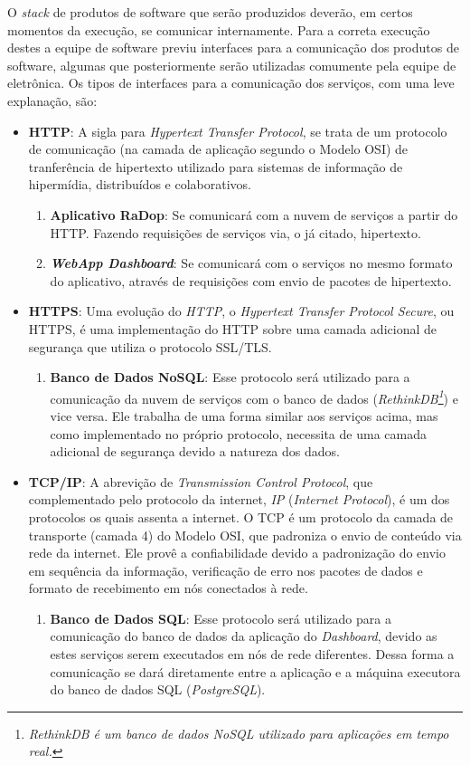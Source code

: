 O \textit{stack} de produtos de software que serão produzidos deverão, em certos momentos da execução, se comunicar internamente. Para a correta execução destes a equipe de software previu interfaces para a comunicação dos produtos de software, algumas que posteriormente serão utilizadas comumente pela equipe de eletrônica.
Os tipos de interfaces para a comunicação dos serviços, com uma leve explanação, são:
\begin{itemize}
    \item \textbf{HTTP}:
    A sigla para \textit{Hypertext Transfer Protocol}, se trata de um protocolo de comunicação (na camada de aplicação segundo o Modelo OSI) de tranferência de hipertexto utilizado para sistemas de informação de hipermídia, distribuídos e colaborativos.
    \begin{enumerate}
        \item \textbf{Aplicativo RaDop}: Se comunicará com a nuvem de serviços a partir do HTTP. Fazendo requisições de serviços via, o já citado, hipertexto.
        \item \textbf{\textit{WebApp Dashboard}}: Se comunicará com o serviços no mesmo formato do aplicativo, através de requisições com envio de pacotes de hipertexto.
    \end{enumerate}
    \item \textbf{HTTPS}:
    Uma evolução do \textit{HTTP}, o \textit{Hypertext Transfer Protocol Secure}, ou HTTPS, é uma implementação do HTTP sobre uma camada adicional de segurança que utiliza o protocolo SSL/TLS. 
    \begin{enumerate}
        \item \textbf{Banco de Dados NoSQL}: Esse protocolo será utilizado para a comunicação da nuvem de serviços com o banco de dados (\textit{RethinkDB\footnote{\textit{RethinkDB é um banco de dados \textit{NoSQL} utilizado para aplicações em tempo real.}}}) e vice versa. Ele trabalha de uma forma similar aos serviços acima, mas como implementado no próprio protocolo, necessita de uma camada adicional de segurança devido a natureza dos dados.
    \end{enumerate}
    \item \textbf{TCP/IP}:
    A abrevição de \textit{Transmission Control Protocol}, que complementado pelo protocolo da internet, \textit{IP} (\textit{Internet Protocol}), é um dos protocolos os quais assenta a internet. O TCP é um protocolo da camada de transporte (camada 4) do Modelo OSI, que padroniza o envio de conteúdo via rede da internet. Ele provê a confiabilidade devido a padronização do envio em sequência da informação, verificação de erro nos pacotes de dados e formato de recebimento em nós conectados à rede.
    \begin{enumerate}
        \item \textbf{Banco de Dados SQL}: Esse protocolo será utilizado para a comunicação do banco de dados da aplicação do \textit{Dashboard}, devido as estes serviços serem executados em nós de rede diferentes. Dessa forma a comunicação se dará diretamente entre a aplicação e a máquina executora do banco de dados SQL (\textit{PostgreSQL}).
    \end{enumerate}
\end{itemize}

